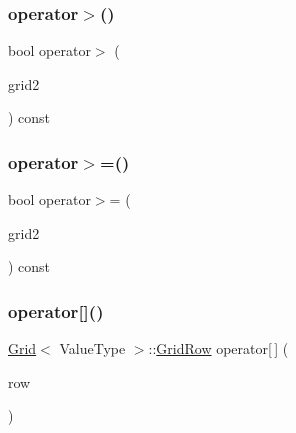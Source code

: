 \mbox{\label{classGrid_aa2d6af2768a176d9ba044cf34087d766}} 
\subsubsection{\texorpdfstring{operator$>$()}{operator>()}}
{\footnotesize\ttfamily bool operator$>$ (\begin{DoxyParamCaption}\item[{const \mbox{\hyperlink{classGrid}{Grid}}$<$ Value\+Type $>$ \&}]{grid2 }\end{DoxyParamCaption}) const}

\mbox{\label{classGrid_a21431c500035c200656a8d67e96531c7}} 
\subsubsection{\texorpdfstring{operator$>$=()}{operator>=()}}
{\footnotesize\ttfamily bool operator$>$= (\begin{DoxyParamCaption}\item[{const \mbox{\hyperlink{classGrid}{Grid}}$<$ Value\+Type $>$ \&}]{grid2 }\end{DoxyParamCaption}) const}

\mbox{\label{classGrid_aa62a62fb923c387dbec19d9559fea429}} 
\subsubsection{\texorpdfstring{operator[]()}{operator[]()}\hspace{0.1cm}{\footnotesize\ttfamily [1/4]}}
{\footnotesize\ttfamily \mbox{\hyperlink{classGrid}{Grid}}$<$ Value\+Type $>$\+::\mbox{\hyperlink{classGrid_1_1GridRow}{Grid\+Row}} operator\mbox{[}$\,$\mbox{]} (\begin{DoxyParamCaption}\item[{int}]{row }\end{DoxyParamCaption})}

\mbox{\label{classGrid_a8b881f7fb1e524d4cf2766bde140eeb1}} 
